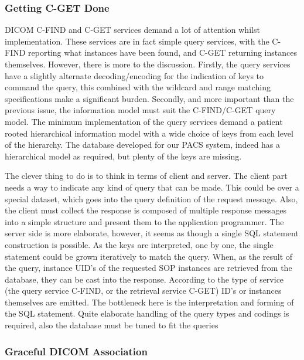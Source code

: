 \documentclass[a4paper,10pt]{article}
\begin{document}
\subsubsection{Getting C-GET Done}

DICOM C-FIND and C-GET services demand a lot of attention whilst
implementation. These services are in fact simple query services, with the
C-FIND reporting what instances have been found, and C-GET returning
instances themselves. However, there is more to the discussion. Firstly, the
query services have a slightly alternate decoding/encoding for the
indication of keys to command the query, this combined with the wildcard and
range matching specifications make a significant burden. Secondly, and more
important than the previous issue, the information model must suit the
C-FIND/C-GET query model. The minimum implementation of the query services
demand a patient rooted hierarchical information model with a wide choice of
keys from each level of the hierarchy. The database developed for our PACS
system, indeed has a hierarchical model as required, but plenty of the keys
are missing.



The clever thing to do is to think in terms of client and server. The client
part needs a way to indicate any kind of query that can be made. This could
be over a special dataset, which goes into the query definition of the
request message. Also, the client must collect the response is composed of
multiple response messages into a simple structure and present them to the
application programmer. The server side is more elaborate, however, it seems
as though a single SQL statement construction is possible. As the keys are
interpreted, one by one, the single statement could be grown iteratively to
match the query. When, as the result of the query, instance UID{'}s of the
requested SOP instances are retrieved from the database, they can be cast
into the response. According to the type of service (the query service
C-FIND, or the retrieval service C-GET) ID{'}s or instances themselves are
emitted. The bottleneck here is the interpretation and forming of the SQL
statement. Quite elaborate handling of the query types and codings is
required, also the database must be tuned to fit the queries


\subsubsection{Graceful DICOM Association}
\end{document}
